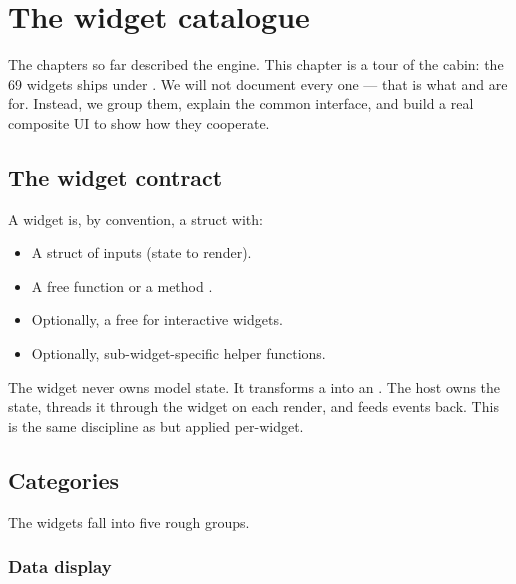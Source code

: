 \chapter{The widget catalogue}
\label{ch:widgets}

The chapters so far described the engine. This chapter is a tour of
the cabin: the 69 widgets \maya{} ships under
. We will not document every one ---
that is what  and 
are for. Instead, we group them, explain the common interface, and
build a real composite UI to show how they cooperate.

\section{The widget contract}

A \maya{} widget is, by convention, a struct with:

\begin{itemize}[leftmargin=*]
  \item A  struct of inputs (state to render).
  \item A free function  or a method
    .
  \item Optionally, a free  for interactive widgets.
  \item Optionally, sub-widget-specific helper functions.
\end{itemize}

The widget never owns model state. It transforms a 
into an . The host owns the state, threads it through
the widget on each render, and feeds events back. This is the same
discipline as  but applied per-widget.

\section{Categories}

The widgets fall into five rough groups.

\subsection{Data display}

